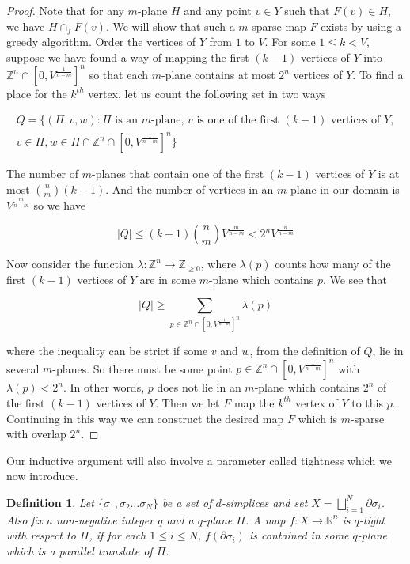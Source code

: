 \documentclass[12pt]{article}
\newtheorem{definition}{Definition}
\newcommand{\ZZ}{\mathbb{Z}}
\newcommand{\RR}{\mathbb{R}}
\begin{document}
	\begin{proof} Note that for any $m$-plane $H$ and any point $v \in Y$ such that $F(v) \in H$, we have $H \cap_f F(v)$. We will show that such a $m$-sparse map $F$ exists by using a greedy algorithm. Order the vertices of $Y$ from $1$ to $V$. For some $1 \le k < V$, suppose we have found a way of mapping the first $(k-1)$ vertices of $Y$ into $\ZZ^n \cap [0, V^{\frac{1}{n-m}}]^n$ so that each $m$-plane contains at most $2^n$ vertices of $Y$. To find a place for the $k^{th}$ vertex, let us count the following set in two ways
	
	\begin{gather}
	Q = \{(\Pi, v, w):  \text{$\Pi$ is an $m$-plane, $v$ is one of the first $(k-1)$ vertices of $Y$}, \\
	v \in \Pi, w \in \Pi \cap \ZZ^n \cap  [0, V^{\frac{1}{n-m}}]^n\}
	\end{gather}
	
	\noindent The number of $m$-planes that contain one of the first $(k-1)$ vertices of $Y$ is at most ${n \choose m} (k-1)$. And the number of vertices in an $m$-plane in our domain is $V^{\frac{m}{n-m}}$ so we have
	
	$$|Q| \le (k-1) {n \choose m} V^{\frac{m}{n-m}} < 2^n V^{\frac{n}{n-m}}$$
		
	Now consider the function $\lambda: \ZZ^n \to \ZZ_{\ge 0}$, where $\lambda(p)$ counts how many of the first $(k-1)$ vertices of $Y$ are in some $m$-plane which contains $p$. We see that
		
	$$|Q| \ge \sum_{p \in \ZZ^n \cap [0, V^{\frac{1}{n-m}}]^n} \lambda(p)$$
		
	\noindent where the inequality can be strict if some $v$ and $w$, from the definition of $Q$, lie in several $m$-planes. So there must be some point $p \in \ZZ^n \cap [0, V^{\frac{1}{n-m}}]^n$ with $\lambda(p) < 2^n$. In other words, $p$ does not lie in an $m$-plane which contains $2^n$ of the first $(k-1)$ vertices of $Y$. Then we let $F$ map the $k^{th}$ vertex of $Y$ to this $p$. Continuing in this way we can construct the desired map $F$ which is $m$-sparse with overlap $2^n$.
	\end{proof}
	
	Our inductive argument will also involve a parameter called tightness which we now introduce.
	
	\begin{definition}  Let $\{\sigma_1, \sigma_2 \ldots \sigma_N\}$ be a set of $d$-simplices and set $X = \bigsqcup_{i=1}^N \partial \sigma_i$.
	Also fix a non-negative integer $q$ and a $q$-plane $\Pi$. A map $f: X \to \RR^n$ is $q$-tight with respect to $\Pi$, if for each $1 \le i \le N$, $f(\partial \sigma_i)$ is contained in some $q$-plane which is a parallel translate of $\Pi$. 
	\end{definition}
	
\end{document}
